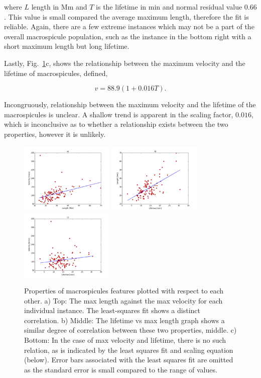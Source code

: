 \noindent where $L$ length in Mm and $T$ is the lifetime in min and normal residual value $0.66$. This value is small compared the average maximum length, therefore the fit is reliable. Again, there are a few extreme instances which may not be a part of the overall macrospicule population, such as the instance in the bottom right with a short maximum length but long lifetime. 

Lastly, Fig.~\ref{fig:prop-rel}c, shows the relationship between the maximum velocity and the lifetime of macrospicules, defined,

\begin{equation}
v = 88.9(1 + 0.016T).
\end{equation}

Incongruously, relationship between the maximum velocity and the lifetime of the macrospicules is unclear. A shallow trend is apparent in the scaling factor, $0.016$, which is inconclusive as to whether a relationship exists between the two properties, however it is unlikely.

\begin{figure}[h!]
	\centering
	\includegraphics[width=0.4\textwidth]{Chapter3/Figs/length_max_vs.pdf}
	\includegraphics[width=0.4\textwidth]{Chapter3/Figs/lifetime_vs_length.pdf}
	\includegraphics[width=0.4\textwidth]{Chapter3/Figs/velocity_vs_lt.pdf}
	\caption{\small Properties of macrospicules features plotted with respect to each other. a) Top: The max length against the max velocity for each individual instance. The least-squares fit shows a distinct correlation. b) Middle: The lifetime vs max length graph shows a similar degree of correlation between these two properties, middle. c) Bottom: In the case of max velocity and lifetime, there is no such relation, as is indicated by the least squares fit and scaling equation (below). Error bars associated with the least squares fit are omitted as the standard error is small compared to the range of values.}
	\label{fig:prop-rel}	
\end{figure}



